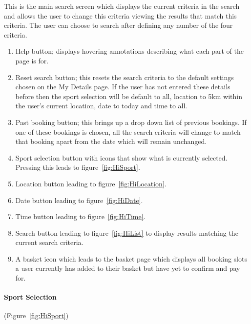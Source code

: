 
This is the main search screen which displays the current criteria in the
search and allows the user to change this criteria viewing the results that
match this criteria. The user can choose to search after defining any number of
the four criteria.
\begin{enumerate}
	\item Help button; displays hovering annotations describing what each part
		of the page is for.
	\item Reset search button; this resets the search criteria to the default
		settings chosen on the My Details page. If the user has not entered
		these details before then the sport selection will be default to all,
		location to 5km within the user's current location, date to today and
		time to all.
	\item Past booking button; this brings up a drop down list of previous
		bookings. If one of these bookings is chosen, all the search criteria
		will change to match that booking apart from the date which will remain
		unchanged.
	\item Sport selection button with icons that show what is currently
		selected.  Pressing this leads to figure~\ref{fig:HiSport}.
	\item Location button leading to figure~\ref{fig:HiLocation}.
	\item Date button leading to figure~\ref{fig:HiDate}.
	\item Time button leading to figure~\ref{fig:HiTime}.
	\item Search button leading to figure~\ref{fig:HiList} to display results
		matching the current search criteria.
	\item A basket icon which leads to the basket page which displays all
		booking slots a user currently has added to their basket but have yet
		to confirm and pay for.
\end{enumerate}

\paragraph{Sport Selection} (Figure~\ref{fig:HiSport})

